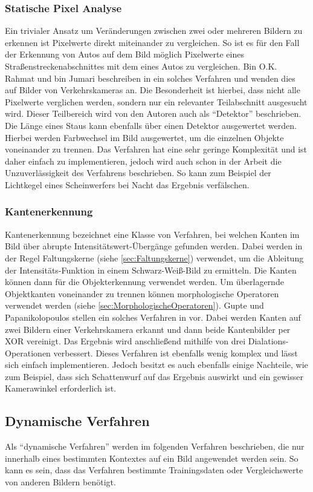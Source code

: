 \subsubsection{Statische Pixel Analyse}
Ein trivialer Ansatz um Veränderungen zwischen zwei oder mehreren Bildern zu erkennen ist Pixelwerte direkt miteinander zu vergleichen.
So ist es für den Fall der Erkennung von Autos auf dem Bild möglich Pixelwerte eines Straßenstreckenabschnittes mit dem eines Autos zu vergleichen.
Bin O.K. Rahmat und bin Jumari beschreiben in \cite{bin2001vehicle} ein solches Verfahren und wenden dies auf Bilder von Verkehrskameras an. 
Die Besonderheit ist hierbei, dass nicht alle Pixelwerte verglichen werden, sondern nur ein relevanter Teilabschnitt ausgesucht wird. Dieser Teilbereich wird von den Autoren auch als "`Detektor"' beschrieben.
Die Länge eines Staus kann ebenfalls über einen Detektor ausgewertet werden.
Hierbei werden Farbwechsel im Bild ausgewertet, um die einzelnen Objekte voneinander zu trennen.
Das Verfahren hat eine sehr geringe Komplexität und ist daher einfach zu implementieren, jedoch wird auch schon in der Arbeit die Unzuverlässigkeit des Verfahrens beschrieben. 
So kann zum Beispiel der Lichtkegel eines Scheinwerfers bei Nacht das Ergebnis verfälschen.
\subsubsection{Kantenerkennung}
Kantenerkennung bezeichnet eine Klasse von Verfahren, bei welchen Kanten im Bild über abrupte Intensitätswert-Übergänge gefunden werden. 
Dabei werden in der Regel Faltungskerne (siehe \ref{sec:Faltungskerne}) verwendet, um die Ableitung der Intensitäts-Funktion in einem Schwarz-Weiß-Bild zu ermitteln.
Die Kanten können dann für die Objekterkennung verwendet werden. Um überlagernde Objektkanten voneinander zu trennen können morphologische Operatoren verwendet werden (siehe \ref{sec:MorphologischeOperatoren}).
Gupte und Papanikolopoulos stellen ein solches Verfahren in \cite{gupte2000algorithms} vor. Dabei werden Kanten auf zwei Bildern einer Verkehrskamera erkannt und dann beide Kantenbilder per XOR vereinigt. Das Ergebnis wird anschließend mithilfe von drei Dialations-Operationen verbessert.
Dieses Verfahren ist ebenfalls wenig komplex und lässt sich einfach implementieren. Jedoch besitzt es auch ebenfalls einige Nachteile, wie zum Beispiel, dass sich Schattenwurf auf das Ergebnis auswirkt und ein gewisser Kamerawinkel erforderlich ist.
\subsection{Dynamische Verfahren}
Als "`dynamische Verfahren"' werden im folgenden Verfahren beschrieben, die nur innerhalb eines bestimmten Kontextes auf ein Bild angewendet werden sein. So kann es sein, dass das Verfahren bestimmte Trainingsdaten oder Vergleichswerte von anderen Bildern benötigt.
